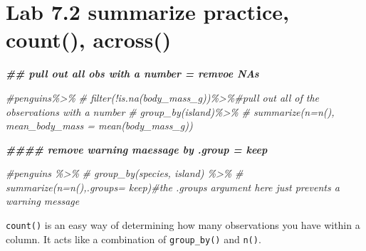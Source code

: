 \documentclass[
]{article}
\newenvironment{Shaded}{\begin{snugshade}}{\end{snugshade}}
\newcommand{\CommentTok}[1]{\textcolor[rgb]{0.56,0.35,0.01}{\textit{#1}}}
\newcommand{\DocumentationTok}[1]{\textcolor[rgb]{0.56,0.35,0.01}{\textbf{\textit{#1}}}}
\begin{document}
\hypertarget{lab-7.2-summarize-practice-count-across}{%
\section{Lab 7.2 summarize practice, count(),
across()}\label{lab-7.2-summarize-practice-count-across}}

\begin{Shaded}
\begin{Highlighting}[]
\DocumentationTok{\#\# pull out all obs with a number = remvoe NAs}

\CommentTok{\#penguins\%\textgreater{}\%}
\CommentTok{\#  filter(!is.na(body\_mass\_g))\%\textgreater{}\%\#pull out all of the observations with a number}
\CommentTok{\#  group\_by(island)\%\textgreater{}\%}
\CommentTok{\#  summarize(n=n(), mean\_body\_mass = mean(body\_mass\_g))}

\DocumentationTok{\#\#\#\# remove warning maessage by .group = \textquotesingle{}keep\textquotesingle{}}

\CommentTok{\#penguins \%\textgreater{}\% }
\CommentTok{\#  group\_by(species, island) \%\textgreater{}\% }
\CommentTok{\#  summarize(n=n(),.groups= \textquotesingle{}keep\textquotesingle{})\#the .groups argument here just prevents a warning message}
\end{Highlighting}
\end{Shaded}

\texttt{count()} is an easy way of determining how many observations you
have within a column. It acts like a combination of \texttt{group\_by()}
and \texttt{n()}.
\end{document}
